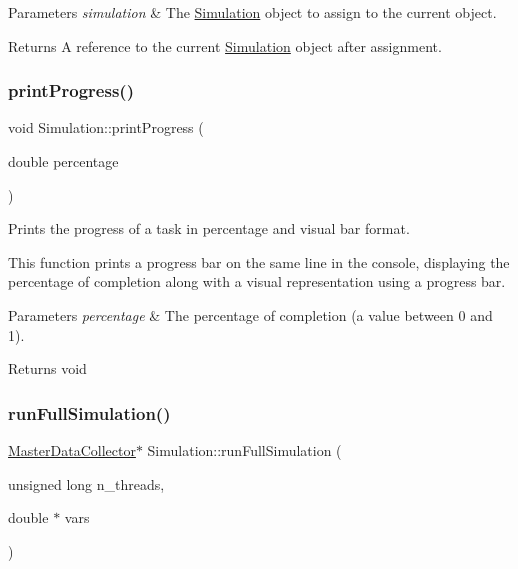\begin{DoxyParams}{Parameters}
{\em simulation} & The \mbox{\hyperlink{classSimulation}{Simulation}} object to assign to the current object. \\
\hline
\end{DoxyParams}
\begin{DoxyReturn}{Returns}
A reference to the current \mbox{\hyperlink{classSimulation}{Simulation}} object after assignment. 
\end{DoxyReturn}
\mbox{\label{classSimulation_a3279f9efae2c262b54ad4d16c631033c}} 
\subsubsection{\texorpdfstring{print\+Progress()}{printProgress()}}
{\footnotesize\ttfamily void Simulation\+::print\+Progress (\begin{DoxyParamCaption}\item[{double}]{percentage }\end{DoxyParamCaption})}



Prints the progress of a task in percentage and visual bar format. 

This function prints a progress bar on the same line in the console, displaying the percentage of completion along with a visual representation using a progress bar.


\begin{DoxyParams}{Parameters}
{\em percentage} & The percentage of completion (a value between 0 and 1).\\
\hline
\end{DoxyParams}
\begin{DoxyReturn}{Returns}
void 
\end{DoxyReturn}
\mbox{\label{classSimulation_a401edb8c7e3390fee0340212993bcd79}} 
\subsubsection{\texorpdfstring{run\+Full\+Simulation()}{runFullSimulation()}}
{\footnotesize\ttfamily \mbox{\hyperlink{classMasterDataCollector}{Master\+Data\+Collector}}$\ast$ Simulation\+::run\+Full\+Simulation (\begin{DoxyParamCaption}\item[{unsigned long}]{n\+\_\+threads,  }\item[{double $\ast$}]{vars }\end{DoxyParamCaption})}



